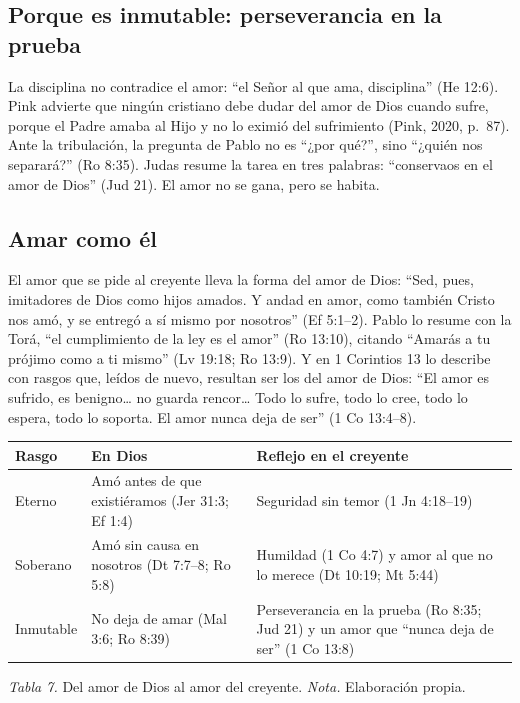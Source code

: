\documentclass[11pt,letterpaper]{article}
\begin{document}
\subsection{Porque es inmutable: perseverancia en la prueba}
La disciplina no contradice el amor: ``el Señor al que ama, disciplina'' (He 12:6). Pink advierte que ningún cristiano debe dudar del amor de Dios cuando sufre, porque el Padre amaba al Hijo y no lo eximió del sufrimiento (Pink, 2020, p.~87). Ante la tribulación, la pregunta de Pablo no es ``¿por qué?'', sino ``¿quién nos separará?'' (Ro 8:35). Judas resume la tarea en tres palabras: ``conservaos en el amor de Dios'' (Jud 21). El amor no se gana, pero se habita.

\subsection{Amar como él}
El amor que se pide al creyente lleva la forma del amor de Dios: ``Sed, pues, imitadores de Dios como hijos amados. Y andad en amor, como también Cristo nos amó, y se entregó a sí mismo por nosotros'' (Ef 5:1--2). Pablo lo resume con la Torá, ``el cumplimiento de la ley es el amor'' (Ro 13:10), citando ``Amarás a tu prójimo como a ti mismo'' (Lv 19:18; Ro 13:9). Y en 1 Corintios 13 lo describe con rasgos que, leídos de nuevo, resultan ser los del amor de Dios: ``El amor es sufrido, es benigno\ldots{} no guarda rencor\ldots{} Todo lo sufre, todo lo cree, todo lo espera, todo lo soporta. El amor nunca deja de ser'' (1 Co 13:4--8).

\begin{center}\small\renewcommand{\arraystretch}{1.2}
\begin{tabular}{@{}L{2.4cm}L{5.4cm}L{7.0cm}@{}}
\toprule
\textbf{Rasgo} & \textbf{En Dios} & \textbf{Reflejo en el creyente} \\ \midrule
Eterno & Amó antes de que existiéramos (Jer 31:3; Ef 1:4) & Seguridad sin temor (1 Jn 4:18--19) \\
Soberano & Amó sin causa en nosotros (Dt 7:7--8; Ro 5:8) & Humildad (1 Co 4:7) y amor al que no lo merece (Dt 10:19; Mt 5:44) \\
Inmutable & No deja de amar (Mal 3:6; Ro 8:39) & Perseverancia en la prueba (Ro 8:35; Jud 21) y un amor que ``nunca deja de ser'' (1 Co 13:8) \\
\bottomrule
\end{tabular}\par
{\footnotesize\color{gris}\textit{Tabla 7.} Del amor de Dios al amor del creyente. \textit{Nota.} Elaboración propia.}
\end{center}
\end{document}
